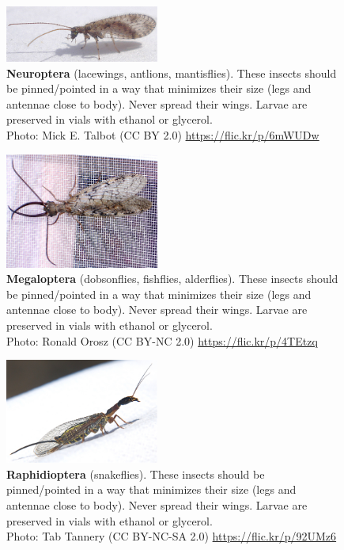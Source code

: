 \documentclass[letterpaper, 11pt]{article}
\begin{document}
\begin{figure}
  \caption{\textbf{Neuroptera} (lacewings, antlions, mantisflies). These insects should be pinned/pointed in a way that minimizes their size (legs and antennae close to body). Never spread their wings. Larvae are preserved in vials with ethanol or glycerol.\\ Photo: Mick E. Talbot (CC BY 2.0) \url{https://flic.kr/p/6mWUDw}}
  \includegraphics[width=0.45\textwidth]{Neuroptera}
\end{figure}

\begin{figure}
  \caption{\textbf{Megaloptera} (dobsonflies, fishflies, alderflies). These insects should be pinned/pointed in a way that minimizes their size (legs and antennae close to body). Never spread their wings. Larvae are preserved in vials with ethanol or glycerol.\\ Photo: Ronald Orosz (CC BY-NC 2.0) \url{https://flic.kr/p/4TEtzq}}
  \includegraphics[width=0.45\textwidth]{Megaloptera}
\end{figure}

\clearpage

\begin{figure}
  \caption{\textbf{Raphidioptera} (snakeflies). These insects should be pinned/pointed in a way that minimizes their size (legs and antennae close to body). Never spread their wings. Larvae are preserved in vials with ethanol or glycerol.\\ Photo: Tab Tannery (CC BY-NC-SA 2.0) \url{https://flic.kr/p/92UMz6}}
  \includegraphics[width=0.45\textwidth]{Raphidioptera}
\end{figure}
\end{document}
